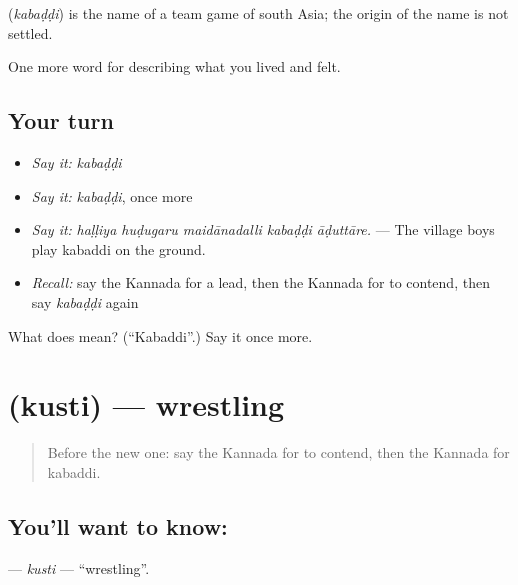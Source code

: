 \begin{cousinweb}
\textbf{} (\emph{kabaḍḍi}) is the name of a team game of south Asia; the origin of the name is not settled.
\end{cousinweb}

\begin{grammarlens}[title={What you've built}]
One more word for describing what you lived and felt.
\end{grammarlens}

\subsection*{Your turn}
\begin{itemize}
\raggedright
  \item \emph{Say it:} \emph{kabaḍḍi}
  \item \emph{Say it:} \emph{kabaḍḍi}, once more
  \item \emph{Say it:} \emph{haḷḷiya huḍugaru maidānadalli kabaḍḍi āḍuttāre.} — The village boys play kabaddi on the ground.
  \item \emph{Recall:} say the Kannada for a lead, then the Kannada for to contend, then say \emph{kabaḍḍi} again
\end{itemize}

\begin{tcolorbox}[breakable,colback=teal!4,colframe=teal!35!black,title={Before you move on}]
What does  mean? (\textquotedblleft{}Kabaddi\textquotedblright{}.) Say it once more.
\end{tcolorbox}
\section[\texorpdfstring{\kn{ಕುಸ್ತಿ} (kusti)}{ಕುಸ್ತಿ (kusti)}]{ (kusti) — wrestling}

\label{lesson:KA-C540-kusti}



\begin{quote}
Before the new one: say the Kannada for to contend, then the Kannada for kabaddi.
\end{quote}

\subsection*{You'll want to know: }
\textbf{} — \emph{kusti} — \textquotedblleft{}wrestling\textquotedblright{}.

